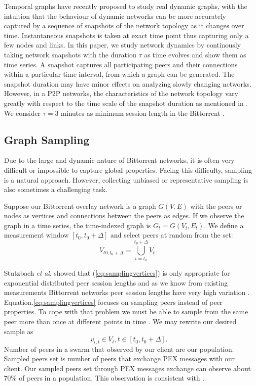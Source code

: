 \documentclass[10pt,conference,letterpaper]{IEEEtran}
\begin{document}
Temporal graphs have recently proposed to study real dynamic graphs, with the intuition that the behaviour of dynamic networks can be more accurately captured by a sequence of snapshots of the network topology as it changes over time.
Instantaneous snapshots is taken at exact time point thus capturing only a few nodes and links.
In this paper, we study network dynamics by continously taking network snapshots with the duration $\tau$ as time evolves and show them as time series.
A snapshot captures all participating peers and their connections within a particular time interval, from which a graph can be generated.
The snapshot duration may have minor effects on analyzing slowly changing networks.
However, in a P2P networks, the characteristics of the network topology vary greatly with respect to the time scale of the snapshot duration as mentioned in \cite{stutzbach2008characterizing}.
We consider $\tau=3 $ minutes as minimum session length in the Bittorrent \cite{stutzbach2006understanding}. 

\subsection{Graph Sampling}
Due to the large and dynamic nature of Bittorrent networks, it is often very difficult or impossible to capture global properties. 
Facing this difficulty, sampling is a natural approach.
However, collecting unbiased or representative sampling is also sometimes a challenging task.

Suppose our Bittorrent overlay network is a graph $G(V,E)$ with the peers or nodes as vertices and connections between the peers as edges. 
If we observe the graph in a time series, the time-indexed graph is $G_t = G(V_t,E_t)$.   
We define a measurement window $[t_0,t_0 + \Delta]$ and select peers at random from the set:
 \begin{equation}
V_{t0,t_0+\Delta} = \bigcup_{t=t_0}^{t_0+\Delta} V_t.
 \label{eq:samplingvertices}
 \end{equation}

Stutzbach \textit{et al}. \cite{stutzbach2007sampling} showed that  (\ref{eq:samplingvertices}) is only appropriate for exponential distributed  peer session lengths and as we know from existing measurements Bittorrent networks peer session lengths have very high variation \cite{guo2005measurements}.  
Equation.\ref{eq:samplingvertices} focuses on sampling peers instead of peer properties. 
To cope with that problem we must be able to sample from the same peer more than once at different points in time \cite{stutzbach2007sampling}. 
We may rewrite our desired sample as
\begin{equation}
\ v_{i,t} \in V_t  , t \in [t_0, t_0 + \Delta].
\label{eq:samplingvertices2}
\end{equation}
Number of peers in a swarm that observed by our client are our population. 
Sampled peers set is number of peers that exchange PEX messages with our client.
Our sampled peers set through PEX messages exchange can observe about $70\%$ of peers in a population.
This observation is consistent with \cite{wu2010understanding}.
\end{document}
